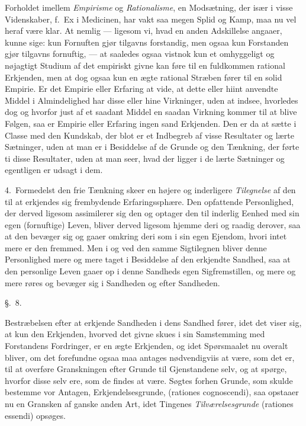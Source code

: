 \documentclass[12pt,a4paper]{book}
\newcommand{\apage}[1]{\marginnote{\footnotesize\textit{[#1]}}}
\begin{document}
Forholdet imellem \emph{Empirisme} og \emph{Rationalisme}, en Modsætning, der især i
visse Videnskaber, f.~Ex i Medicinen, har vakt saa megen Splid og Kamp, maa nu
vel heraf være klar. At nemlig --- ligesom vi, hvad en anden Adskillelse angaaer,
kunne sige: kun Fornuften gjør tilgavns forstandig, men ogsaa kun Forstanden gjør
tilgavns fornuftig, --- at saaledes ogsaa vistnok kun et omhyggeligt og nøjagtigt
Studium af det empiriskt givne kan føre til en fuldkommen rational Erkjenden, men
at dog ogsaa kun en ægte rational Stræben fører til en solid Empirie. Er det
Empirie eller Erfaring at vide, at dette eller hiint anvendte Middel i
Almindelighed har disse eller hine Virkninger, uden at indsee, hvorledes \apage{71}  dog og
hvorfor just af et saadant Middel en saadan Virkning kommer til at blive Følgen,
saa er Empirie eller Erfaring ingen sand Erkjenden. Den er da at sætte i Classe
med den Kundskab, der blot er et Indbegreb af visse Resultater og lærte
Sætninger, uden at man er i Besiddelse af de Grunde og den Tænkning, der førte ti
disse Resultater, uden at man seer, hvad der ligger i de lærte Sætninger og
egentligen er udsagt i dem.

4.~Formedelst den frie Tænkning skeer en højere og inderligere \emph{Tilegnelse} af den
til at erkjendes sig frembydende Erfaringssphære. Den opfattende Personlighed,
der derved ligesom assimilerer sig den og optager den til inderlig Eenhed med sin
egen (fornuftige) Leven, bliver derved ligesom hjemme deri og raadig derover, saa
at den bevæger sig og gaaer omkring deri som i sin egen Ejendom, hvori intet mere
er den fremmed. Men i og ved den samme Sigtilegnen bliver denne Personlighed mere
og mere taget i Besiddelse af den erkjendte Sandhed, saa at den personlige Leven
gaaer op i denne Sandheds egen Sigfremstillen, og mere og mere røres og bevæger
sig i Sandheden og efter Sandheden.

\begin{center}\large\S.~8.\end{center}

\apage{72} Bestræbelsen efter at erkjende Sandheden i dens Sandhed fører, idet det viser
sig, at kun den Erkjenden, hvorved det givne skues i sin Samstemming med
Forstandens Fordringer, er en ægte Erkjenden, og idet Spørsmaalet nu overalt
bliver, om det forefundne ogsaa maa antages nødvendigviis at være, som det er,
til at overføre Granskningen efter Grunde til Gjenstandene selv, og at spørge,
hvorfor disse selv ere, som de findes at være. Søgtes forhen Grunde, som skulde
bestemme vor Antagen, Erkjendelsesgrunde, (rationes cognoscendi), saa opstaaer nu
en Gransken af ganske anden Art, idet Tingenes \emph{Tilværelsesgrunde} (rationes
essendi) opsøges.
\end{document}
